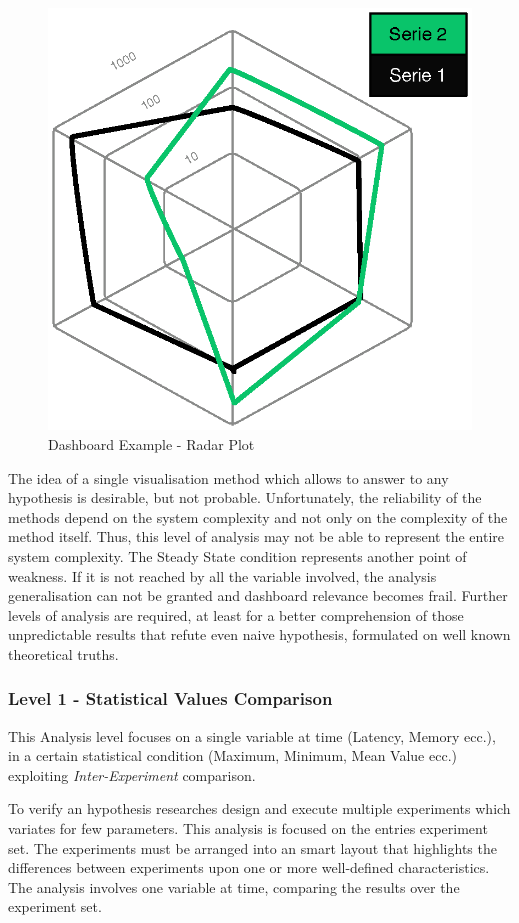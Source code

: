 \begin{figure}[tbh]
  \centering
	\includegraphics[width=0.5\linewidth]{images/radar-plot}
	\caption{Dashboard Example - Radar Plot} 	
  	\label{fig:radar}
\end{figure}

The idea of a single visualisation method which allows to answer to any hypothesis is desirable, but not probable.  Unfortunately, the reliability of the methods depend on the system complexity and not only on the complexity of the method itself. Thus, this level of analysis may not be able to represent the entire system complexity. The Steady State condition represents another point of weakness. If it is not reached by all the variable involved, the analysis generalisation can not be granted and dashboard relevance becomes frail. Further levels of analysis are required, at least for a better comprehension of those unpredictable results that refute even naive hypothesis, formulated on well known theoretical truths.


\subsubsection{Level 1 -  Statistical Values Comparison}\label{sec:heaven-level1}

This Analysis level focuses on a single variable at time (Latency, Memory ecc.), in a certain statistical condition (Maximum, Minimum, Mean Value ecc.) exploiting \textit{Inter-Experiment} comparison. 

To verify an hypothesis researches design and execute multiple experiments which variates for few parameters. This analysis is focused on the entries experiment set. The experiments must be arranged into an smart layout that highlights the differences between experiments upon one or more well-defined characteristics. The analysis involves one variable at time, comparing the results over the experiment set. 

